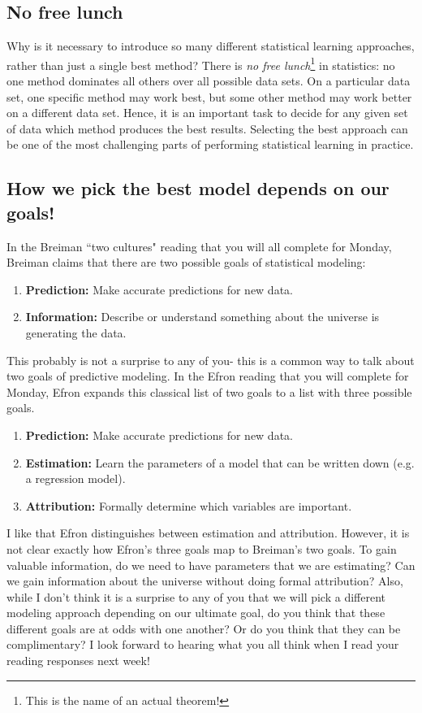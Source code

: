 \subsection{No free lunch}

Why is it necessary to introduce so many different statistical learning approaches, rather than just a single best method? There is \emph{no free lunch}\footnote{This is the name of an actual theorem!} in statistics: no one method dominates all others over all possible data sets. On a particular data set, one specific method may work best, but some other method may work better on a different data set. Hence, it is an important task to decide for any given set of data which method produces the best results. Selecting the best approach can be one of the most challenging parts of performing statistical learning in practice.

\subsection{How we pick the best model depends on our goals!}

In the Breiman ``two cultures" reading that you will all complete for Monday, Breiman claims that there are two possible goals of statistical modeling: 
\begin{enumerate}
\item \textbf{Prediction:} Make accurate predictions for new data. 	
\item \textbf{Information:} Describe or understand something about the universe is generating the data.
\end{enumerate}
This probably is not a surprise to any of you- this is a common way to talk about two goals of predictive modeling. In the Efron reading that you will complete for Monday, Efron expands this classical list of two goals to a list with three possible goals. 
\begin{enumerate}
\item \textbf{Prediction:} Make accurate predictions for new data. 
\item \textbf{Estimation:} Learn the parameters of a model that can be written down (e.g. a regression model). 
\item \textbf{Attribution:} Formally determine which variables are important. 
\end{enumerate}
I like that Efron distinguishes between estimation and attribution. However, it is not clear exactly how Efron's three goals map to Breiman's two goals. To gain valuable information, do we need to have parameters that we are estimating? Can we gain information about the universe without doing formal attribution? Also, while I don't think it is a surprise to any of you that we will pick a different modeling approach depending on our ultimate goal, do you think that these different goals are at odds with one another? Or do you think that they can be complimentary? I look forward to hearing what you all think when I read your reading responses next week! 

